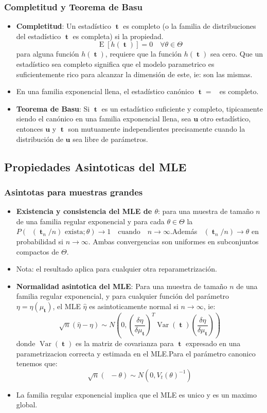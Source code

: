 \documentclass[pdftex,11pt,a4paper]{article}
\DeclareMathOperator{\muestra}{\mathbf{y}}
\DeclareMathOperator{\that}{\mathbf{\hat{\theta}}}
\DeclareMathOperator{\est}{\mathbf{t}}
\DeclareMathOperator{\ty}{\mathbf{t}(\muestra)}
\DeclareMathOperator{\E}{E}
\DeclareMathOperator{\Var}{Var}
\begin{document}
\subsubsection{Completitud y Teorema de Basu}
\begin{itemize}
	\item \textbf{Completitud}: Un estadístico $\est$ es completo (o la familia de distribuciones del estadístico $\est$ es completa) si la propiedad. $$\E[h(\est)] = 0 \quad \forall \theta \in \Theta$$ para alguna función $h(\est)$, requiere que la función $h(\est)$ sea cero. Que un estadístico sea completo significa que el modelo parametrico es suficientemente rico para alcanzar la dimensión de este, ie: son las mismas.
	\item En una familia exponencial llena, el estadístico canónico $\est = \ty$ es completo.
	\item \textbf{Teorema de Basu}: Si $\est$ es un estadístico suficiente y completo, tipicamente siendo el canónico en una familia exponencial llena, sea $\mathbf{u}$ otro estadístico, entonces $\mathbf{u}$ y $\est$ son mutuamente independientes precisamente cuando la distribución de $\mathbf{u}$ sea libre de parámetros.
\end{itemize}

\subsection{Propiedades Asintoticas del MLE}
\subsubsection{Asintotas para muestras grandes}
\begin{itemize}
	\item \textbf{Existencia y consistencia del MLE de $\theta$}: para una muestra de tamaño $n$ de una familia regular exponencial y para cada $\theta \in \Theta$ la $P(\that(\est_n/n) \text{ exista};\theta) \rightarrow 1 \quad \text{cuando} \quad n \rightarrow \infty$.Además $\that(\est_n/n) \rightarrow \theta$ en probabilidad si $n \rightarrow \infty$. Ambas convergencias son uniformes en subconjuntos compactos de $\Theta$. 
	\item Nota: el resultado aplica para cualquier otra reparametrización.
	
	\item \textbf{Normalidad asintotica del MLE}: Para una muestra de tamaño $n$ de una familia regular exponencial, y para cualquier función del parámetro $\eta = \eta(\mu_{\est})$, el MLE $\hat{\eta}$ es asintoticamente normal si $n \rightarrow \infty$, ie: $$\sqrt{n}(\hat{\eta}-\eta) \sim N\left(0, \left( \dfrac{\delta \eta}{ \delta \mu_{\est}} \right) ^T \Var(\est) \left(\dfrac{\delta \eta}{ \delta \mu_{\est} }\right) \right) $$ donde $\Var(\est)$ es la matriz de covarianza para $\est$ expresado en una parametrizacion correcta y estimada en el MLE.Para el parámetro canonico tenemos que:$$\sqrt{n}(\that-\theta) \sim N(0,V_t(\theta)^{-1})$$
	\item La familia regular exponencial implica que el MLE es unico y es un maximo global.
\end{itemize}
\end{document}
